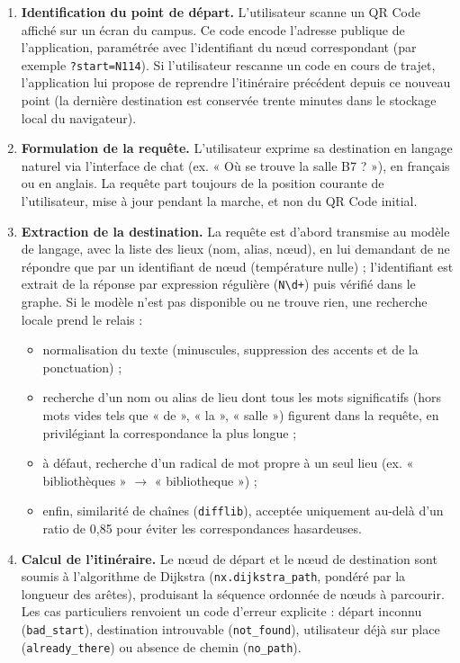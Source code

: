 \documentclass[12pt,a4paper]{report}
\begin{document}
\begin{enumerate}
  \item \textbf{Identification du point de départ.} L'utilisateur scanne un QR Code affiché sur un
  écran du campus. Ce code encode l'adresse publique de l'application, paramétrée avec
  l'identifiant du nœud correspondant (par exemple \texttt{?start=N114}). Si l'utilisateur
  rescanne un code en cours de trajet, l'application lui propose de reprendre l'itinéraire
  précédent depuis ce nouveau point (la dernière destination est conservée trente minutes dans le
  stockage local du navigateur).

  \item \textbf{Formulation de la requête.} L'utilisateur exprime sa destination en langage
  naturel via l'interface de chat (ex. « Où se trouve la salle B7 ? »), en français ou en anglais.
  La requête part toujours de la position courante de l'utilisateur, mise à jour pendant la marche,
  et non du QR Code initial.

  \item \textbf{Extraction de la destination.} La requête est d'abord transmise au modèle de
  langage, avec la liste des lieux (nom, alias, nœud), en lui demandant de ne répondre que par un
  identifiant de nœud (température nulle) ; l'identifiant est extrait de la réponse par expression
  régulière (\texttt{N\textbackslash d+}) puis vérifié dans le graphe. Si le modèle n'est pas
  disponible ou ne trouve rien, une recherche locale prend le relais :
  \begin{itemize}
    \item normalisation du texte (minuscules, suppression des accents et de la ponctuation) ;
    \item recherche d'un nom ou alias de lieu dont tous les mots significatifs (hors mots vides
    tels que « de », « la », « salle ») figurent dans la requête, en privilégiant la
    correspondance la plus longue ;
    \item à défaut, recherche d'un radical de mot propre à un seul lieu (ex. « bibliothèques »
    $\rightarrow$ « bibliotheque ») ;
    \item enfin, similarité de chaînes (\texttt{difflib}), acceptée uniquement au-delà d'un ratio
    de 0{,}85 pour éviter les correspondances hasardeuses.
  \end{itemize}

  \item \textbf{Calcul de l'itinéraire.} Le nœud de départ et le nœud de destination sont soumis à
  l'algorithme de Dijkstra (\texttt{nx.dijkstra\_path}, pondéré par la longueur des arêtes),
  produisant la séquence ordonnée de nœuds à parcourir. Les cas particuliers renvoient un code
  d'erreur explicite : départ inconnu (\texttt{bad\_start}), destination introuvable
  (\texttt{not\_found}), utilisateur déjà sur place (\texttt{already\_there}) ou absence de chemin
  (\texttt{no\_path}).


\end{enumerate}
\end{document}
